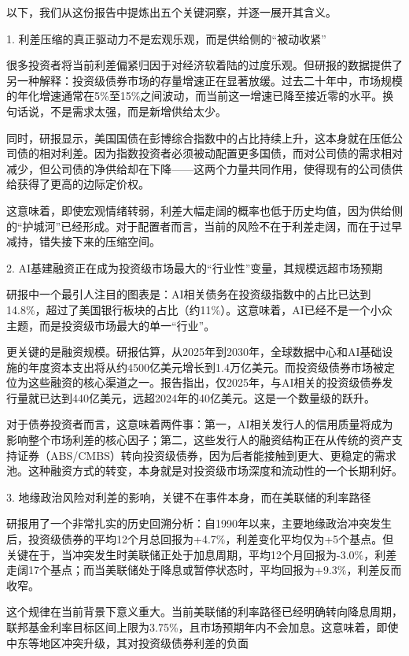 \documentclass[11pt]{ctexart}
\begin{document}
以下，我们从这份报告中提炼出五个关键洞察，并逐一展开其含义。

1. 利差压缩的真正驱动力不是宏观乐观，而是供给侧的“被动收紧”

很多投资者将当前利差偏紧归因于对经济软着陆的过度乐观。但研报的数据提供了另一种解释：投资级债券市场的存量增速正在显著放缓。过去二十年中，市场规模的年化增速通常在5\%至15\%之间波动，而当前这一增速已降至接近零的水平。换句话说，不是需求太强，而是新增供给太少。

同时，研报显示，美国国债在彭博综合指数中的占比持续上升，这本身就在压低公司债的相对利差。因为指数投资者必须被动配置更多国债，而对公司债的需求相对减少，但公司债的净供给却在下降——这两个力量共同作用，使得现有的公司债供给获得了更高的边际定价权。

这意味着，即使宏观情绪转弱，利差大幅走阔的概率也低于历史均值，因为供给侧的“护城河”已经形成。对于配置者而言，当前的风险不在于利差走阔，而在于过早减持，错失接下来的压缩空间。

2. AI基建融资正在成为投资级市场最大的“行业性”变量，其规模远超市场预期

研报中一个最引人注目的图表是：AI相关债务在投资级指数中的占比已达到14.8\%，超过了美国银行板块的占比（约11\%）。这意味着，AI已经不是一个小众主题，而是投资级市场最大的单一“行业”。

更关键的是融资规模。研报估算，从2025年到2030年，全球数据中心和AI基础设施的年度资本支出将从约4500亿美元增长到1.4万亿美元。而投资级债券市场被定位为这些融资的核心渠道之一。报告指出，仅2025年，与AI相关的投资级债券发行量就已达到440亿美元，远超2024年的40亿美元。这是一个数量级的跃升。

对于债券投资者而言，这意味着两件事：第一，AI相关发行人的信用质量将成为影响整个市场利差的核心因子；第二，这些发行人的融资结构正在从传统的资产支持证券（ABS/CMBS）转向投资级债券，因为后者能接触到更大、更稳定的需求池。这种融资方式的转变，本身就是对投资级市场深度和流动性的一个长期利好。

3. 地缘政治风险对利差的影响，关键不在事件本身，而在美联储的利率路径

研报用了一个非常扎实的历史回溯分析：自1990年以来，主要地缘政治冲突发生后，投资级债券的平均12个月总回报为+4.7\%，利差变化平均仅为+5个基点。但关键在于，当冲突发生时美联储正处于加息周期，平均12个月回报为-3.0\%，利差走阔17个基点；而当美联储处于降息或暂停状态时，平均回报为+9.3\%，利差反而收窄。

这个规律在当前背景下意义重大。当前美联储的利率路径已经明确转向降息周期，联邦基金利率目标区间上限为3.75\%，且市场预期年内不会加息。这意味着，即使中东等地区冲突升级，其对投资级债券利差的负面
\end{document}
